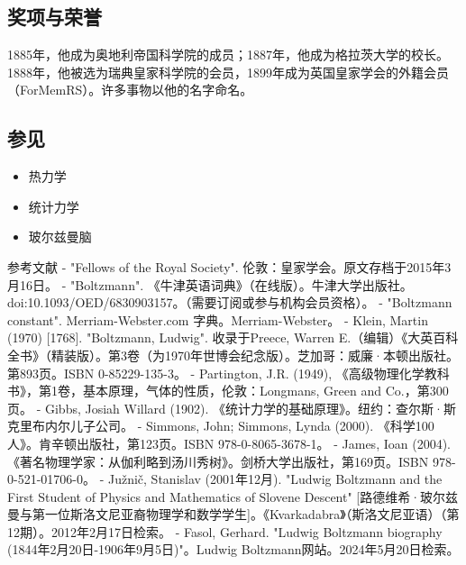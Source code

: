 \subsection{奖项与荣誉} 
1885年，他成为奥地利帝国科学院的成员；1887年，他成为格拉茨大学的校长。1888年，他被选为瑞典皇家科学院的会员，1899年成为英国皇家学会的外籍会员（ForMemRS）。许多事物以他的名字命名。
\subsection{参见}  
\begin{itemize}
\item 热力学  
\item 统计力学  
\item 玻尔兹曼脑
\end{itemize}

参考文献  
- "Fellows of the Royal Society". 伦敦：皇家学会。原文存档于2015年3月16日。  
- "Boltzmann". 《牛津英语词典》（在线版）。牛津大学出版社。doi:10.1093/OED/6830903157。（需要订阅或参与机构会员资格）。  
- "Boltzmann constant". Merriam-Webster.com 字典。Merriam-Webster。  
- Klein, Martin (1970) [1768]. "Boltzmann, Ludwig". 收录于Preece, Warren E.（编辑）《大英百科全书》（精装版）。第3卷（为1970年世博会纪念版）。芝加哥：威廉·本顿出版社。第893页。ISBN 0-85229-135-3。  
- Partington, J.R. (1949), 《高级物理化学教科书》，第1卷，基本原理，气体的性质，伦敦：Longmans, Green and Co.，第300页。  
- Gibbs, Josiah Willard (1902). 《统计力学的基础原理》。纽约：查尔斯·斯克里布内尔儿子公司。  
- Simmons, John; Simmons, Lynda (2000). 《科学100人》。肯辛顿出版社，第123页。ISBN 978-0-8065-3678-1。  
- James, Ioan (2004). 《著名物理学家：从伽利略到汤川秀树》。剑桥大学出版社，第169页。ISBN 978-0-521-01706-0。  
- Južnič, Stanislav (2001年12月). "Ludwig Boltzmann and the First Student of Physics and Mathematics of Slovene Descent" [路德维希·玻尔兹曼与第一位斯洛文尼亚裔物理学和数学学生]。《Kvarkadabra》（斯洛文尼亚语）（第12期）。2012年2月17日检索。  
- Fasol, Gerhard. "Ludwig Boltzmann biography (1844年2月20日-1906年9月5日)"。Ludwig Boltzmann网站。2024年5月20日检索。